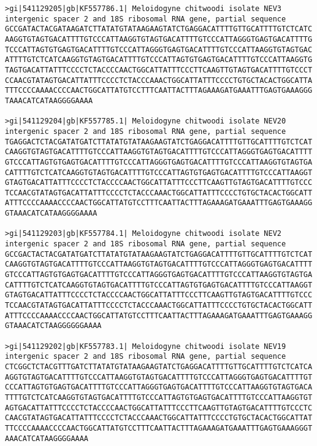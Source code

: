 \documentclass[11pt]{article}
\begin{document}
\begin{Verbatim}[commandchars=\\\{\}]
>gi|541129205|gb|KF557786.1| Meloidogyne chitwoodi isolate NEV3 intergenic spacer 2 and 18S ribosomal RNA gene, partial sequence
GCCGATACTACGATAAGATCTTATATGTATAAGAAGTATCTGAGGACATTTTGTTGCATTTTGTCTCATC
AAGGTGTAGTGACATTTTGTCCCATTAAGGTGTAGTGACATTTTGTCCCATTAGGGTGAGTGACATTTTG
TCCCATTAGTGTGAGTGACATTTTGTCCCATTAGGGTGAGTGACATTTTGTCCCATTAAGGTGTAGTGAC
ATTTTGTCTCATCAAGGTGTAGTGACATTTTGTCCCATTAGTGTGAGTGACATTTTGTCCCATTAAGGTG
TAGTGACATTATTTCCCCTCTACCCCAACTGGCATTATTTCCCTTCAAGTTGTAGTGACATTTTGTCCCT
CCAACGTATAGTGACATTATTTCCCCTCTACCCAAACTGGCATTATTTCCCCTGTGCTACACTGGCATTA
TTTCCCCAAAACCCCAACTGGCATTATGTCCTTTCAATTACTTTAGAAAGATGAAATTTGAGTGAAAGGG
TAAACATCATAAGGGGAAAA

>gi|541129204|gb|KF557785.1| Meloidogyne chitwoodi isolate NEV20 intergenic spacer 2 and 18S ribosomal RNA gene, partial sequence
TGAGGACTCTACGATATGATCTTATATGTATAAGAAGTATCTGAGGACATTTTGTTGCATTTTGTCTCAT
CAAGGTGTAGTGACATTTTGTCCCATTAAGGTGTAGTGACATTTTGTCCCATTAGGGTGAGTGACATTTT
GTCCCATTAGTGTGAGTGACATTTTGTCCCATTAGGGTGAGTGACATTTTGTCCCATTAAGGTGTAGTGA
CATTTTGTCTCATCAAGGTGTAGTGACATTTTGTCCCATTAGTGTGAGTGACATTTTGTCCCATTAAGGT
GTAGTGACATTATTTCCCCTCTACCCCAACTGGCATTATTTCCCTTCAAGTTGTAGTGACATTTTGTCCC
TCCAACGTATAGTGACATTATTTCCCCTCTACCCAAACTGGCATTATTTCCCCTGTGCTACACTGGCATT
ATTTCCCCAAAACCCCAACTGGCATTATGTCCTTTCAATTACTTTAGAAAGATGAAATTTGAGTGAAAGG
GTAAACATCATAAGGGGAAAA

>gi|541129203|gb|KF557784.1| Meloidogyne chitwoodi isolate NEV2 intergenic spacer 2 and 18S ribosomal RNA gene, partial sequence
GCCGACTACTACGATATGATCTTATATGTATAAGAAGTATCTGAGGACATTTTGTTGCATTTTGTCTCAT
CAAGGTGTAGTGACATTTTGTCCCATTAAGGTGTAGTGACATTTTGTCCCATTAGGGTGAGTGACATTTT
GTCCCATTAGTGTGAGTGACATTTTGTCCCATTAGGGTGAGTGACATTTTGTCCCATTAAGGTGTAGTGA
CATTTTGTCTCATCAAGGTGTAGTGACATTTTGTCCCATTAGTGTGAGTGACATTTTGTCCCATTAAGGT
GTAGTGACATTATTTCCCCTCTACCCCAACTGGCATTATTTCCCTTCAAGTTGTAGTGACATTTTGTCCC
TCCAACGTATAGTGACATTATTTCCCCTCTACCCAAACTGGCATTATTTCCCCTGTGCTACACTGGCATT
ATTTCCCCAAAACCCCAACTGGCATTATGTCCTTTCAATTACTTTAGAAAGATGAAATTTGAGTGAAAGG
GTAAACATCTAAGGGGGGAAAA

>gi|541129202|gb|KF557783.1| Meloidogyne chitwoodi isolate NEV19 intergenic spacer 2 and 18S ribosomal RNA gene, partial sequence
CTCGGCTCTACGTTTGATCTTATATGTATAAGAAGTATCTGAGGACATTTTGTTGCATTTTGTCTCATCA
AGGTGTAGTGACATTTTGTCCCATTAAGGTGTAGTGACATTTTGTCCCATTAGGGTGAGTGACATTTTGT
CCCATTAGTGTGAGTGACATTTTGTCCCATTAGGGTGAGTGACATTTTGTCCCATTAAGGTGTAGTGACA
TTTTGTCTCATCAAGGTGTAGTGACATTTTGTCCCATTAGTGTGAGTGACATTTTGTCCCATTAAGGTGT
AGTGACATTATTTCCCCTCTACCCCAACTGGCATTATTTCCCTTCAAGTTGTAGTGACATTTTGTCCCTC
CAACGTATAGTGACATTATTTCCCCTCTACCCAAACTGGCATTATTTCCCCTGTGCTACACTGGCATTAT
TTCCCCAAAACCCCAACTGGCATTATGTCCTTTCAATTACTTTAGAAAGATGAAATTTGAGTGAAAGGGT
AAACATCATAAGGGGAAAA


\end{Verbatim}
\end{document}
